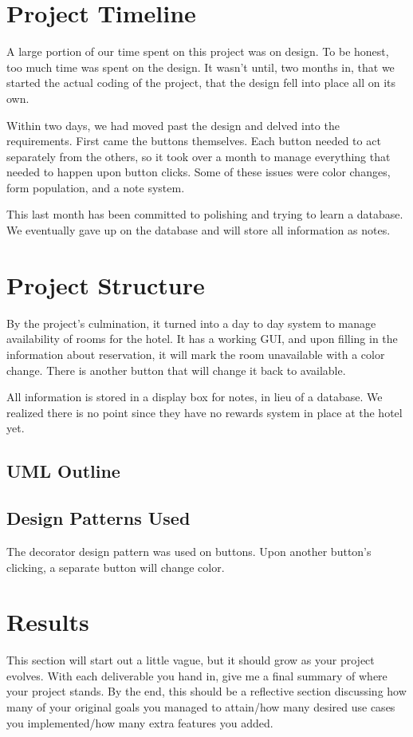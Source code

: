 \documentclass[10pt,conference,onecolumn,compsoc]{IEEEtran}
\begin{document}
\section{Project Timeline}
A large portion of our time spent on this project was on design. To be honest, too much time was spent on the design. It wasn't until, two months in, that we started the actual coding of the project, that the design fell into place all on its own. 

Within two days, we had moved past the design and delved into the requirements. First came the buttons themselves. Each button needed to act separately from the others, so it took over a month to manage everything that needed to happen upon button clicks. Some of these issues were color changes, form population, and a note system.

This last month has been committed to polishing and trying to learn a database. We eventually gave up on the database and will store all information as notes.

\section{Project Structure}
By the project's culmination, it turned into a day to day system to manage availability of rooms for the hotel. It has a working GUI, and upon filling in the information about reservation, it will mark the room unavailable with a color change. There is another button that will change it back to available. 

All information is stored in a display box for notes, in lieu of a database. We realized there is no point since they have no rewards system in place at the hotel yet. 

\subsection{UML Outline}





\subsection{Design Patterns Used}
The decorator design pattern was used on buttons. Upon another button's clicking, a separate button will change color. 


\section{Results}
This section will start out a little vague, but it should grow as your project evolves.  With each deliverable you hand in, give me a final summary of where your project stands.  By the end, this should be a reflective section discussing how many of your original goals you managed to attain/how many desired use cases you implemented/how many extra features you added.
\end{document}
